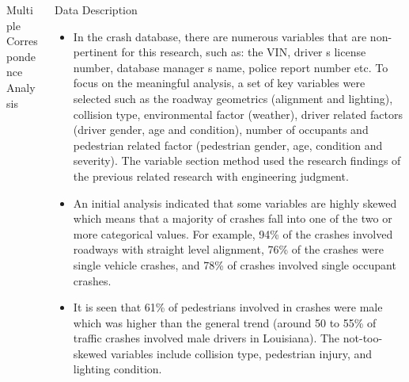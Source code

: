 \documentclass[final]{beamer}
\newlength{\onecolwid}
\newlength{\twocolwid}
\begin{document}
\begin{frame}[t]
\begin{columns}[t]
\begin{column}{\twocolwid}
\begin{columns}[t,totalwidth=\twocolwid]
\begin{column}{\onecolwid}
\begin{block}{Multiple Correspondence Analysis}
\begin{figure}
\begin{center}
                \caption{Clouds of points generated by MCA method.}
                \label{fig:multDom}
              \end{center}
            \end{figure}
          \end{block}
        \end{column}
        \begin{column}{\onecolwid}\vspace{-.69in}
          \begin{block}{Data Description}
             \small{}
             \begin{itemize}
              \item In the crash database, there are numerous variables that are non-pertinent for this research, such as: the VIN, driver \textquotesingle s license number, database manager \textquotesingle s name, police report number etc. To focus on the meaningful analysis, a set of key variables were selected such as the roadway geometrics (alignment and lighting), collision type, environmental factor (weather), driver related factors (driver gender, age and condition), number of occupants and pedestrian related factor (pedestrian gender, age, condition and severity). The variable section method used the research findings of the previous related research with engineering judgment.
              \item An initial analysis indicated that some variables are highly skewed which means that a majority of crashes fall into one of the two or more categorical values. For example, 94\% of the crashes involved roadways with straight level alignment, 76\% of the crashes were single vehicle crashes, and 78\% of crashes involved single occupant crashes.
              \item It is seen that 61\% of pedestrians involved in crashes were male which was higher than the general trend (around 50 to 55\% of traffic crashes involved male drivers in Louisiana). The not-too-skewed variables include collision type, pedestrian injury, and lighting condition.
            \end{itemize}


\end{block}
\end{column}
\end{columns}
\end{column}
\end{columns}
\end{frame}
\end{document}
